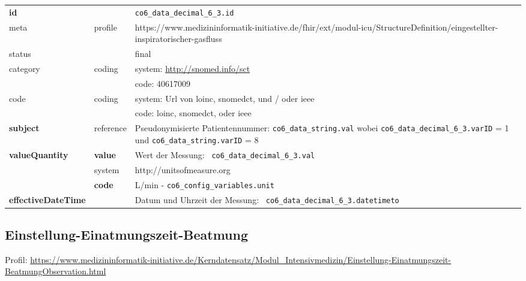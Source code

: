 \begin{longtable}{|l|l|p{7.5cm}|}
	\hline
	\rowcolor{lightgray} \multicolumn{3}{|l|}{Data Mapping (inhaltlich)} \\ \hline
	\textbf{id} &  & \texttt{co6\_data\_decimal\_6\_3.id} \\ \hline
	meta & profile & https://www.medizininformatik-initiative.de/fhir/ext/modul-icu/StructureDefinition/eingestellter-inspiratorischer-gasfluss \\ \hline 
	status &  & final   \\ \hline 
	category & coding & system: \url{http://snomed.info/sct} \\
	\cline{3-3}
	& & code: 40617009 \\ \hline
	code & coding & system: Url von \ac{loinc}, \ac{snomedct}, und / oder \ac{ieee} \\ 
	\cline{3-3} 
	&  & code: \ac{loinc}, \ac{snomedct}, oder \ac{ieee} \\ \hline
	\textbf{subject} & reference & Pseudonymisierte Patientennummer: \texttt{co6\_data\_string.val} wobei \texttt{co6\_data\_decimal\_6\_3.varID} = 1 und \texttt{co6\_data\_string.varID} = 8 \\ \hline
	\textbf{valueQuantity}  & \textbf{value} & Wert der Messung: \texttt{
		co6\_data\_decimal\_6\_3.val} \\
	\cline{2-3}
	& system & http://unitsofmeasure.org \\
	\cline{2-3}
	& \textbf{code} &
	L/min - \texttt{co6\_config\_variables.unit}
	\\ \hline
	\textbf{effectiveDateTime}  & & Datum und Uhrzeit der Messung: \texttt{
		co6\_data\_decimal\_6\_3.datetimeto} \\ \hline
\end{longtable}

\subsection{Einstellung-Einatmungszeit-Beatmung}

Profil: \url{https://www.medizininformatik-initiative.de/Kerndatensatz/Modul_Intensivmedizin/Einstellung-Einatmungszeit-BeatmungObservation.html}

